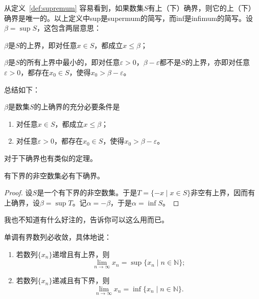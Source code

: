 \documentclass[zihao = -4, linespread = 1.5]{ctexart}
\begin{document}
从定义~\ref{def:supremum} 容易看到，如果数集$S$有上（下）确界，则它的上（下）确界是唯一的。以上定义中sup是supermum的简写，而inf是infimum的简写。设$\beta = \sup S$，这包含两层意思：\begin{enumerate*}[label=(\roman*)]
\item $\beta$是$S$的上界，即对任意$x \in S$，都成立$x\leqslant \beta$；
\item $\beta$是$S$的所有上界中最小的，即对任意$\varepsilon > 0$，$\beta - \varepsilon$都不是$S$的上界，亦即对任意$\varepsilon > 0$，都存在$x_0 \in S$，使得$x_0 > \beta - \varepsilon$。
\end{enumerate*}
总结如下：
\begin{theorem}\label{thm:1}
$\beta$是数集$S$的上确界的充分必要条件是
\begin{enumerate}[label=\textup{(\arabic*)},leftmargin=2\parindent]
  \item 对任意$x \in S$，都成立$x \leq \beta$；
  \item 对任意$\varepsilon > 0$，都存在$x_0 \in S$，使得$x_0 > \beta - \varepsilon$。
\end{enumerate}
\end{theorem}
对于下确界也有类似的定理。


\begin{corollary}[确界原理]\label{cor:1}
有下界的非空数集必有下确界。
\end{corollary}

\begin{proof}
  设$S$是一个有下界的非空数集。于是$T = \{-x \mid x \in S\}$非空有上界，因而有上确界，设$\beta = \sup T$。记$\alpha = -\beta$，于是$\alpha = \inf S$。
\end{proof}

\begin{remark}
我也不知道有什么好注的，告诉你可以这么用而已。
\end{remark}

\begin{theorem}[单调收敛定理]\label{thm:monotone}
  单调有界数列必收敛，具体地说：
  \begin{enumerate}[label=\textup{(\arabic*)}]
    \item 若数列$\{x_n \}$递增且有上界，则
    \[\lim_{n \to \infty} x_n = \sup\{x_n \mid n \in \mathbb{N} \}; \]

    \item 若数列$\{x_n \}$递减且有下界，则
    \[\lim_{n \to \infty} x_n = \inf \{x_n \mid n \in \mathbb{N} \}. \]
  \end{enumerate}
\end{theorem}
\end{document}
